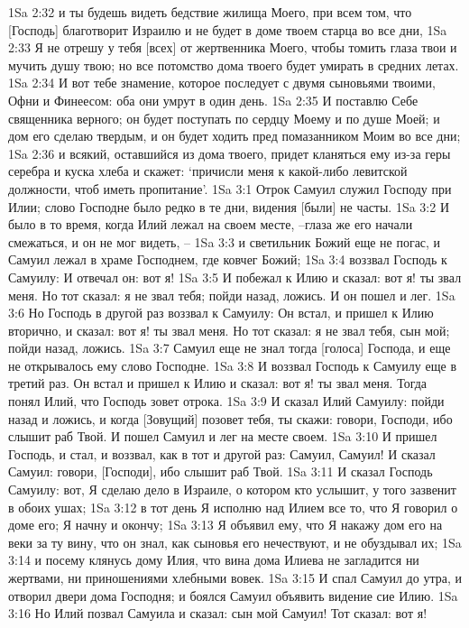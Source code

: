 1Sa 2:32  и ты будешь видеть бедствие жилища Моего, при всем том, что [Господь] благотворит Израилю и не будет в доме твоем старца во все дни,
1Sa 2:33  Я не отрешу у тебя [всех] от жертвенника Моего, чтобы томить глаза твои и мучить душу твою; но все потомство дома твоего будет умирать в средних летах.
1Sa 2:34  И вот тебе знамение, которое последует с двумя сыновьями твоими, Офни и Финеесом: оба они умрут в один день.
1Sa 2:35  И поставлю Себе священника верного; он будет поступать по сердцу Моему и по душе Моей; и дом его сделаю твердым, и он будет ходить пред помазанником Моим во все дни;
1Sa 2:36  и всякий, оставшийся из дома твоего, придет кланяться ему из-за геры серебра и куска хлеба и скажет: `причисли меня к какой-либо левитской должности, чтоб иметь пропитание'.
1Sa 3:1  Отрок Самуил служил Господу при Илии; слово Господне было редко в те дни, видения [были] не часты.
1Sa 3:2  И было в то время, когда Илий лежал на своем месте, --глаза же его начали смежаться, и он не мог видеть, --
1Sa 3:3  и светильник Божий еще не погас, и Самуил лежал в храме Господнем, где ковчег Божий;
1Sa 3:4  воззвал Господь к Самуилу: И отвечал он: вот я!
1Sa 3:5  И побежал к Илию и сказал: вот я! ты звал меня. Но тот сказал: я не звал тебя; пойди назад, ложись. И он пошел и лег.
1Sa 3:6  Но Господь в другой раз воззвал к Самуилу: Он встал, и пришел к Илию вторично, и сказал: вот я! ты звал меня. Но тот сказал: я не звал тебя, сын мой; пойди назад, ложись.
1Sa 3:7  Самуил еще не знал тогда [голоса] Господа, и еще не открывалось ему слово Господне.
1Sa 3:8  И воззвал Господь к Самуилу еще в третий раз. Он встал и пришел к Илию и сказал: вот я! ты звал меня. Тогда понял Илий, что Господь зовет отрока.
1Sa 3:9  И сказал Илий Самуилу: пойди назад и ложись, и когда [Зовущий] позовет тебя, ты скажи: говори, Господи, ибо слышит раб Твой. И пошел Самуил и лег на месте своем.
1Sa 3:10  И пришел Господь, и стал, и воззвал, как в тот и другой раз: Самуил, Самуил! И сказал Самуил: говори, [Господи], ибо слышит раб Твой.
1Sa 3:11  И сказал Господь Самуилу: вот, Я сделаю дело в Израиле, о котором кто услышит, у того зазвенит в обоих ушах;
1Sa 3:12  в тот день Я исполню над Илием все то, что Я говорил о доме его; Я начну и окончу;
1Sa 3:13  Я объявил ему, что Я накажу дом его на веки за ту вину, что он знал, как сыновья его нечествуют, и не обуздывал их;
1Sa 3:14  и посему клянусь дому Илия, что вина дома Илиева не загладится ни жертвами, ни приношениями хлебными вовек.
1Sa 3:15  И спал Самуил до утра, и отворил двери дома Господня; и боялся Самуил объявить видение сие Илию.
1Sa 3:16  Но Илий позвал Самуила и сказал: сын мой Самуил! Тот сказал: вот я!
